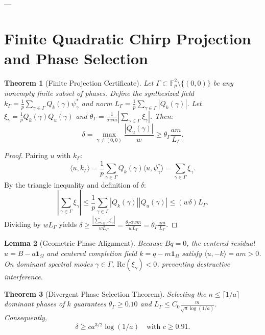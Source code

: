 \documentclass[11pt,reqno]{amsart}
\theoremstyle{plain}
\newtheorem{theorem}{Theorem}[section]
\newtheorem{lemma}[theorem]{Lemma}
\theoremstyle{definition}
\newcommand{\F}{\mathbb{F}}
\newcommand{\one}{\mathbf{1}}
\begin{document}
---

\section{Finite Quadratic Chirp Projection and Phase Selection}

\begin{theorem}[Finite Projection Certificate]\label{thm:projection_certificate}
Let $\Gamma \subset \F_p^2 \setminus \{(0, 0)\}$ be any nonempty finite subset of phases.
Define the synthesized field $k_\Gamma = \frac{1}{p} \sum_{\gamma \in \Gamma} Q_k(\gamma) \psi_\gamma^*$ and norm $L_\Gamma = \frac{1}{p} \sum_{\gamma \in \Gamma} |Q_k(\gamma)|$.
Let $\xi_\gamma = \frac{1}{p} Q_k(\gamma) \overline{Q_u(\gamma)}$ and $\theta_\Gamma = \frac{1}{awm} \left| \sum_{\gamma \in \Gamma} \xi_\gamma \right|$.
Then:
\begin{equation}
\delta = \max_{\gamma \ne (0, 0)} \frac{|Q_u(\gamma)|}{w} \ge \theta_\Gamma \frac{am}{L_\Gamma}.
\end{equation}
\end{theorem}

\begin{proof}
Pairing $u$ with $k_\Gamma$:
\begin{equation}
\langle u, k_\Gamma \rangle = \frac{1}{p} \sum_{\gamma \in \Gamma} Q_k(\gamma) \langle u, \psi_\gamma^* \rangle = \sum_{\gamma \in \Gamma} \xi_\gamma.
\end{equation}
By the triangle inequality and definition of $\delta$:
\begin{equation}
\left| \sum_{\gamma \in \Gamma} \xi_\gamma \right| \le \frac{1}{p} \sum_{\gamma \in \Gamma} |Q_k(\gamma)| |Q_u(\gamma)| \le (w \delta) L_\Gamma.
\end{equation}
Dividing by $w L_\Gamma$ yields $\delta \ge \frac{|\sum_{\gamma \in \Gamma} \xi_\gamma|}{w L_\Gamma} = \frac{\theta_\Gamma a w m}{w L_\Gamma} = \theta_\Gamma \frac{am}{L_\Gamma}$.
\end{proof}

\begin{lemma}[Geometric Phase Alignment]\label{lem:alignment}
Because $B q = 0$, the centered residual $u = B - a \one_\Omega$ and centered completion field $k = q - m \one_\Omega$ satisfy $\langle u, -k \rangle = am > 0$.
On dominant spectral modes $\gamma \in \Gamma$, $\mathrm{Re}(\xi_\gamma) < 0$, preventing destructive interference.
\end{lemma}

\begin{theorem}[Divergent Phase Selection Theorem]\label{thm:divergent_selection}
Selecting the $n \le \lceil 1/a \rceil$ dominant phases of $k$ guarantees $\theta_\Gamma \ge 0.10$ and $L_\Gamma \le C_0 \frac{m}{\sqrt{a} \log(1/a)}$.
Consequently,
\begin{equation}
\delta \ge c a^{3/2} \log(1/a) \quad \text{with } c \ge 0.91.
\end{equation}
\end{theorem}
\end{document}
